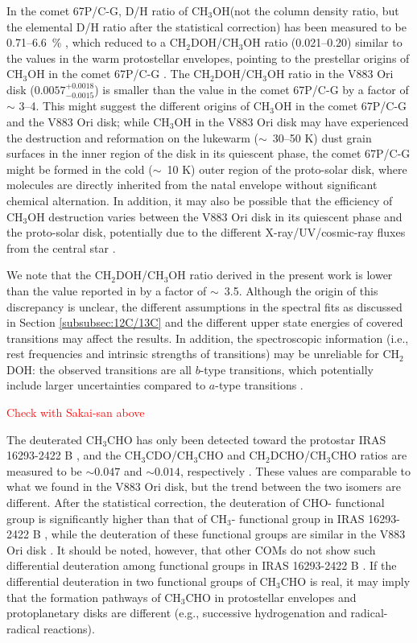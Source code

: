 \documentclass[twocolumn, twocolappendix, astrosymb, times]{aastex631}
\newcommand{\methanol}{CH$_3$OH\xspace}
\newcommand{\acetaldehyde}{CH$_3$CHO\xspace}
\begin{document}
In the comet 67P/C-G, D/H ratio of \methanol (not the column density ratio, but the elemental D/H ratio after the statistical correction) has been measured to be 0.71--6.6~\% \citep{Drozdovskaya2021}, which reduced to a CH$_2$DOH/CH$_3$OH ratio (0.021--0.20) similar to the values in the warm protostellar envelopes, pointing to the prestellar origins of \methanol in the comet 67P/C-G \citep{Drozdovskaya2021}. The CH$_2$DOH/\methanol ratio in the V883 Ori disk ($0.0057_{-0.0015}^{+0.0018}$) is smaller than the value in the comet 67P/C-G by a factor of $\sim$ 3--4. This might suggest the different origins of \methanol in the comet 67P/C-G and the V883 Ori disk; while \methanol in the V883 Ori disk may have experienced the destruction and reformation on the lukewarm ($\sim$~30--50 K) dust grain surfaces in the inner region of the disk in its quiescent phase, the comet 67P/C-G might be formed in the cold ($\sim$~10 K) outer region of the proto-solar disk, where molecules are directly inherited from the natal envelope without significant chemical alternation. In addition, it may also be possible that the efficiency of \methanol destruction varies between the V883 Ori disk in its quiescent phase and the proto-solar disk, potentially due to the different X-ray/UV/cosmic-ray fluxes from the central star \citep{Notsu2021}.

We note that the CH$_2$DOH/\methanol ratio derived in the present work is lower than the value reported in \citet{Lee2019} by a factor of $\sim$~3.5. Although the origin of this discrepancy is unclear, the different assumptions in the spectral fits as discussed in Section \ref{subsubsec:12C/13C} and the different upper state energies of covered transitions may affect the results. In addition, the spectroscopic information (i.e., rest frequencies and intrinsic strengths of transitions) may be unreliable for CH$_2$DOH: the observed transitions are all $b$-type transitions, which potentially include larger uncertainties compared to $a$-type transitions \citep{Pearson2012, Watanabe2021, Ohno2022}. 

\textcolor{red}{Check with Sakai-san above}

The deuterated \acetaldehyde has only been detected toward the protostar IRAS 16293-2422 B \citep{Coudert2019}, and the CH$_3$CDO/\acetaldehyde and CH$_2$DCHO/\acetaldehyde ratios are measured to be $\sim0.047$ and $\sim0.014$, respectively \citep{Manigand2020}. These values are comparable to what we found in the V883 Ori disk, but the trend between the two isomers are different. After the statistical correction, the deuteration of CHO- functional group is significantly higher than that of CH$_3$- functional group in IRAS 16293-2422 B \citep{Manigand2020}, while the deuteration of these functional groups are similar in the V883 Ori disk . It should be noted, however, that other COMs do not show such differential deuteration among functional groups in IRAS 16293-2422 B \citep{Jorgensen2018}. If the differential deuteration in two functional groups of \acetaldehyde is real, it may imply that the formation pathways of \acetaldehyde in protostellar envelopes and protoplanetary disks are different (e.g., successive hydrogenation and radical-radical reactions). 
\end{document}
